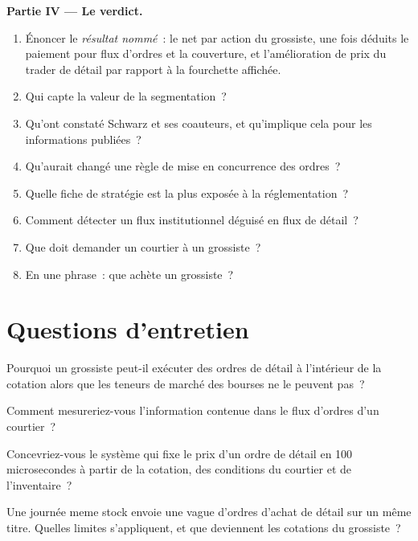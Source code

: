 \begin{problem}
\medskip\noindent\textbf{Partie IV --- Le verdict.}
\begin{enumerate}[resume]
\item Énoncer le \emph{résultat nommé}~: le net par action du grossiste, une fois déduits le paiement pour flux d'ordres et la couverture, et l'amélioration de prix du trader de détail
par rapport à la fourchette affichée.
\item Qui capte la valeur de la segmentation~?
\item Qu'ont constaté Schwarz et ses coauteurs, et qu'implique cela pour les informations publiées~?
\item Qu'aurait changé une règle de mise en concurrence des ordres~?
\item Quelle fiche de stratégie est la plus exposée à la réglementation~?
\item Comment détecter un flux institutionnel déguisé en flux de détail~?
\item Que doit demander un courtier à un grossiste~?
\item En une phrase~: que achète un grossiste~?
\end{enumerate}
\end{problem}

\section{Questions d'entretien}

\begin{interviewq}\label{iq:hf:retail-wholesaling:1}
Pourquoi un grossiste peut-il exécuter des ordres de détail à l'intérieur de la cotation alors que les teneurs de marché des bourses ne le peuvent pas~?
\end{interviewq}

\begin{interviewq}\label{iq:hf:retail-wholesaling:2}
Comment mesureriez-vous l'information contenue dans le flux d'ordres d'un courtier~?
\end{interviewq}

\begin{interviewq}\label{iq:hf:retail-wholesaling:3}
Concevriez-vous le système qui fixe le prix d'un ordre de détail en 100 microsecondes à partir de la cotation, des conditions du courtier et de l'inventaire~?
\end{interviewq}

\begin{interviewq}\label{iq:hf:retail-wholesaling:4}
Une journée meme stock envoie une vague d'ordres d'achat de détail sur un même titre. Quelles limites s'appliquent, et que deviennent les cotations du grossiste~?
\end{interviewq}

